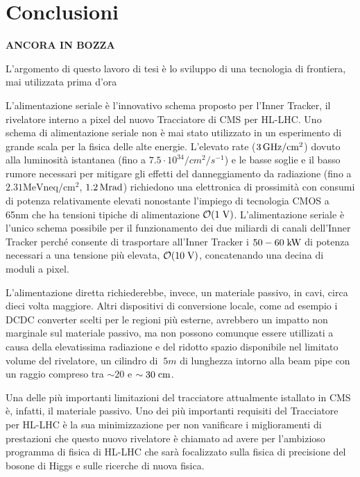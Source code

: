 \chapter{Conclusioni}

{\huge\bf ANCORA IN BOZZA}

L'argomento di questo lavoro di tesi \`e lo sviluppo di una tecnologia di frontiera, mai utilizzata prima d'ora
 
L'alimentazione seriale \`e l'innovativo schema proposto per l'Inner Tracker, il rivelatore interno a pixel del nuovo Tracciatore di CMS per HL-LHC. Uno schema di alimentazione seriale non \`e mai stato utilizzato in un esperimento di grande scala per la fisica delle alte energie. L'elevato rate ($3{\rm \, GHz}/\mathrm{cm^2}$) dovuto alla luminosit\`a istantanea (fino a $7.5\cdot 10^{34}/cm^2/s^{-1}$) e le basse soglie e il basso rumore necessari per mitigare gli effetti del danneggiamento da radiazione (fino a $2.3\mathrm{1MeV neq/cm^2}$, $1.2{\rm \, Mrad}$) richiedono una elettronica di prossimit\`a con consumi di potenza relativamente elevati nonostante l'impiego di tecnologia CMOS a 65nm che ha tensioni tipiche di alimentazione ${\cal O}(1\rm \; V)$. L'alimentazione seriale \`e l'unico schema possibile per il funzionamento dei due miliardi di canali dell'Inner Tracker perch\'e consente di trasportare all'Inner Tracker i $50-60\rm \; kW$ di potenza necessari a una tensione pi\`u elevata, ${\cal O}(10\rm \; V)$, concatenando una decina di moduli a pixel.


L'alimentazione diretta richiederebbe, invece, un materiale passivo, in cavi, circa dieci volta maggiore. Altri dispositivi di conversione locale, come ad esempio i DCDC converter scelti per le regioni pi\`u esterne, avrebbero un impatto non marginale sul materiale passivo, ma non possono comunque essere utillizati a causa della elevatissima radiazione e del ridotto spazio disponibile nel limitato volume del rivelatore, un cilindro di $~5m$ di lunghezza intorno alla beam pipe con un raggio compreso tra $\sim20$ e $\sim 30\rm \; cm$.

Una delle pi\`u importanti limitazioni del tracciatore attualmente istallato in CMS \`e, infatti, il materiale passivo. Uno dei pi\`u importanti requisiti del Tracciatore per HL-LHC \`e la sua minimizzazione per non vanificare i miglioramenti di prestazioni che questo nuovo rivelatore \`e chiamato ad avere per l'ambizioso programma di fisica di HL-LHC che sar\`a focalizzato sulla fisica di precisione del bosone di Higgs e sulle ricerche di nuova fisica. 

